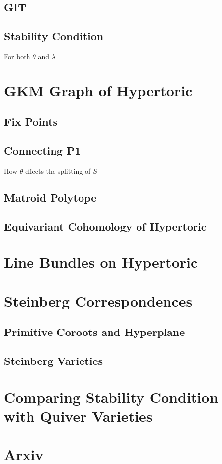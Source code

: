\documentclass[b5paper]{article}
\begin{document}
\subsection{GIT}
\subsection{Stability Condition}
For both $\theta$ and $\lambda$
\section{GKM Graph of Hypertoric}
\subsection{Fix Points}
\subsection{Connecting P1}
How $\theta$ effects the splitting of $S^+$
\subsection{Matroid Polytope}
\subsection{Equivariant Cohomology of Hypertoric}
\section{Line Bundles on Hypertoric}
\section{Steinberg Correspondences}
\subsection{Primitive Coroots and Hyperplane}
\subsection{Steinberg Varieties}

\section{Comparing Stability Condition with Quiver Varieties}
\section{Arxiv}
\end{document}
